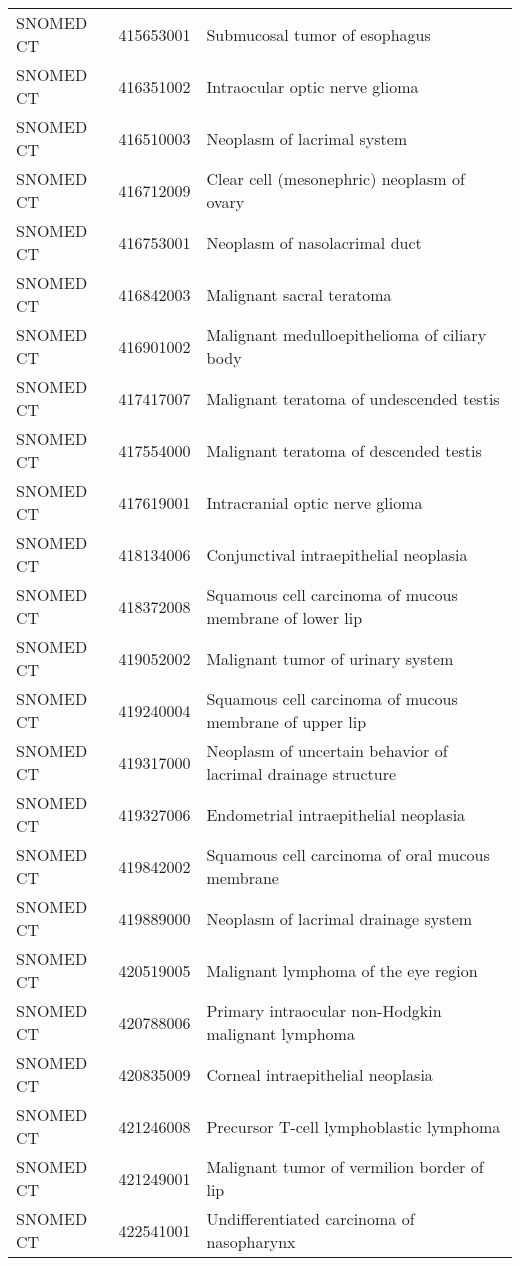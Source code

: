 \begin{longtable}{p{}p{}p{}}
  SNOMED CT & 415653001 & Submucosal tumor of esophagus \\ 
  SNOMED CT & 416351002 & Intraocular optic nerve glioma \\ 
  SNOMED CT & 416510003 & Neoplasm of lacrimal system \\ 
  SNOMED CT & 416712009 & Clear cell (mesonephric) neoplasm of ovary \\ 
  SNOMED CT & 416753001 & Neoplasm of nasolacrimal duct \\ 
  SNOMED CT & 416842003 & Malignant sacral teratoma \\ 
  SNOMED CT & 416901002 & Malignant medulloepithelioma of ciliary body \\ 
  SNOMED CT & 417417007 & Malignant teratoma of undescended testis \\ 
  SNOMED CT & 417554000 & Malignant teratoma of descended testis \\ 
  SNOMED CT & 417619001 & Intracranial optic nerve glioma \\ 
  SNOMED CT & 418134006 & Conjunctival intraepithelial neoplasia \\ 
  SNOMED CT & 418372008 & Squamous cell carcinoma of mucous membrane of lower lip \\ 
  SNOMED CT & 419052002 & Malignant tumor of urinary system \\ 
  SNOMED CT & 419240004 & Squamous cell carcinoma of mucous membrane of upper lip \\ 
  SNOMED CT & 419317000 & Neoplasm of uncertain behavior of lacrimal drainage structure \\ 
  SNOMED CT & 419327006 & Endometrial intraepithelial neoplasia \\ 
  SNOMED CT & 419842002 & Squamous cell carcinoma of oral mucous membrane \\ 
  SNOMED CT & 419889000 & Neoplasm of lacrimal drainage system \\ 
  SNOMED CT & 420519005 & Malignant lymphoma of the eye region \\ 
  SNOMED CT & 420788006 & Primary intraocular non-Hodgkin malignant lymphoma \\ 
  SNOMED CT & 420835009 & Corneal intraepithelial neoplasia \\ 
  SNOMED CT & 421246008 & Precursor T-cell lymphoblastic lymphoma \\ 
  SNOMED CT & 421249001 & Malignant tumor of vermilion border of lip \\ 
  SNOMED CT & 422541001 & Undifferentiated carcinoma of nasopharynx \\ 

\end{longtable}
